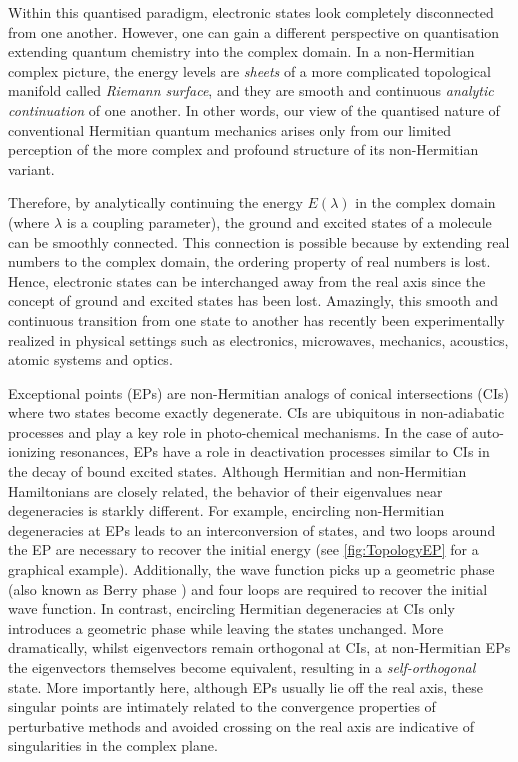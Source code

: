 \documentclass[11pt,a4paper]{article}
\begin{document}
Within this quantised paradigm, electronic states look completely disconnected from one another.
However, one can gain a different perspective on quantisation extending quantum chemistry into the complex domain.
In a non-Hermitian complex picture, the energy levels are \textit{sheets} of a more complicated topological manifold called \textit{Riemann surface}, and they are smooth and continuous \textit{analytic continuation} of one another.
In other words, our view of the quantised nature of conventional Hermitian quantum mechanics arises only from our limited perception of the more complex and profound structure of its non-Hermitian variant.

Therefore, by analytically continuing the energy $E(\lambda)$ in the complex domain (where $\lambda$ is a coupling parameter), the ground and excited states of a molecule can be smoothly connected.
This connection is possible because by extending real numbers to the complex domain, the ordering property of real numbers is lost.
Hence, electronic states can be interchanged away from the real axis since the concept of ground and excited states has been lost.
Amazingly, this smooth and continuous transition from one state to another has recently been experimentally realized in physical settings such as electronics, microwaves, mechanics, acoustics, atomic systems and optics. \cite{Bittner_2012, Chong_2011, Chtchelkatchev_2012, Doppler_2016, Guo_2009, Hang_2013, Liertzer_2012, Longhi_2010, Peng_2014, Peng_2014a, Regensburger_2012, Ruter_2010, Schindler_2011, Szameit_2011, Zhao_2010, Zheng_2013, Choi_2018, El-Ganainy_2018}


Exceptional points (EPs) \cite{Heiss_1990, Heiss_1999, Heiss_2012, Heiss_2016} are non-Hermitian analogs of conical intersections (CIs) \cite{Yarkony_1996} where two states become exactly degenerate.
CIs are ubiquitous in non-adiabatic processes and play a key role in photo-chemical mechanisms.
In the case of auto-ionizing resonances, EPs have a role in deactivation processes similar to CIs in the decay of bound excited states.
Although Hermitian and non-Hermitian Hamiltonians are closely related, the behavior of their eigenvalues near degeneracies is starkly different.
For example, encircling non-Hermitian degeneracies at EPs leads to an interconversion of states, and two loops around the EP are necessary to recover the initial energy (see \autoref{fig:TopologyEP} for a graphical example).
Additionally, the wave function picks up a geometric phase (also known as Berry phase \cite{Berry_1984}) and four loops are required to recover the initial wave function.
In contrast, encircling Hermitian degeneracies at CIs only introduces a geometric phase while leaving the states unchanged.
More dramatically, whilst eigenvectors remain orthogonal at CIs, at non-Hermitian EPs the eigenvectors themselves become equivalent, resulting in a \textit{self-orthogonal} state. \cite{MoiseyevBook}
More importantly here, although EPs usually lie off the real axis, these singular points are intimately related to the convergence properties of perturbative methods and avoided crossing on the real axis are indicative of singularities in the complex plane. \cite{Olsen_1996, Olsen_2000} 
\end{document}
